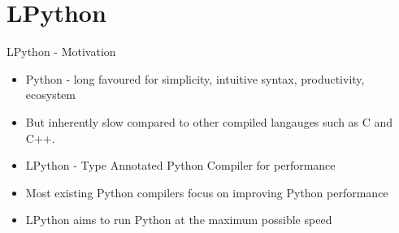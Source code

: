 \section{LPython}

\begin{frame}{LPython - Motivation}
    \begin{itemize}
        \item Python - long favoured for simplicity, intuitive syntax, productivity, ecosystem
        \item But inherently slow compared to other compiled langauges such as C and C++.
        \item LPython - Type Annotated Python Compiler for performance
        \item Most existing Python compilers focus on improving Python performance
        \item LPython aims to run Python at the maximum possible speed
    \end{itemize}
\end{frame}

